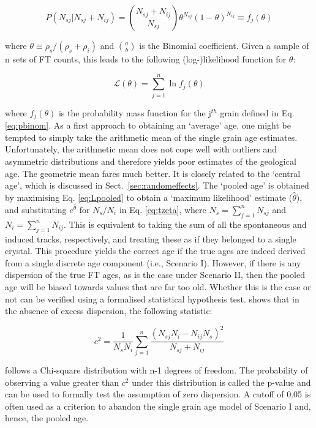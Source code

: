 \documentclass{article}
\begin{document}
\begin{equation}
P(N_{sj}|N_{sj}+N_{ij}) = {{N_{sj}+N_{ij}}\choose{N_{sj}}}
\theta^{N_{sj}} (1-\theta)^{N_{ij}} \equiv f_j(\theta)
\label{eq:pbinom}
\end{equation}

where $\theta \equiv \rho_s/(\rho_s+\rho_i)$ and ${a}\choose{b}$ is
the Binomial coefficient. Given a sample of n sets of FT counts, this
leads to the following (log-)likelihood function for $\theta$:

\begin{equation}
\mathcal{L}(\theta) = \sum\limits_{j=1}^{n} \ln f_j(\theta)
\label{eq:Lpooled}
\end{equation}

where $f_j(\theta)$ is the probability mass function for the j$^{th}$
grain defined in Eq. \ref{eq:pbinom}. As a first approach to obtaining
an `average' age, one might be tempted to simply take the arithmetic
mean of the single grain age estimates. Unfortunately, the arithmetic
mean does not cope well with outliers and asymmetric distributions and
therefore yields poor estimates of the geological age. The geometric
mean fares much better. It is closely related to the `central age',
which is discussed in Sect.~\ref{sec:randomeffects}. The `pooled age'
is obtained by maximising Eq. \ref{eq:Lpooled} to obtain a `maximum
likelihood' estimate ($\hat{\theta}$), and substituting
$e^{\hat{\theta}}$ for $N_s/N_i$ in Eq. \ref{eq:tzeta}, where $N_s =
\sum_{j=1}^{n} N_{sj}$ and $N_i = \sum_{j=1}^{n} N_{ij}$. This is
equivalent to taking the sum of all the spontaneous and induced
tracks, respectively, and treating these as if they belonged to a
single crystal.  This procedure yields the correct age if the true
ages are indeed derived from a single discrete age component (i.e.,
Scenario I). However, if there is any dispersion of the true FT ages,
as is the case under Scenario II, then the pooled age will be biased
towards values that are far too old. Whether this is the case or not
can be verified using a formalised statistical hypothesis
test. \citet[][p.46]{galbraith2005} shows that in the absence of
excess dispersion, the following statistic:

\begin{equation}
  c^2 = \frac{1}{N_sN_i}\sum\limits_{j=1}^{n}\frac{(N_{sj}N_i-N_{ij}N_s)^2}{N_{sj}+N_{ij}}
  \label{eq:X2}
\end{equation}

follows a Chi-square distribution with n-1 degrees of freedom. The
probability of observing a value greater than $c^2$ under this
distribution is called the p-value and can be used to formally test
the assumption of zero dispersion. A cutoff of 0.05 is often used as a
criterion to abandon the single grain age model of Scenario I and,
hence, the pooled age.
\end{document}
